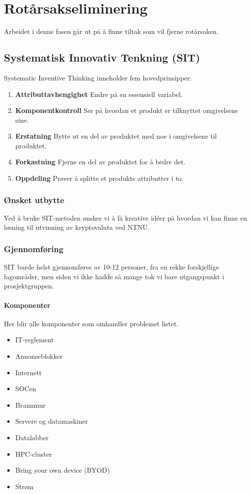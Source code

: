 \chapter{Rotårsakseliminering}
Arbeidet i denne fasen går ut på å finne tiltak som vil fjerne rotårsaken.

\section{Systematisk Innovativ Tenkning (SIT)}
Systematic Inventive Thinking inneholder fem hovedprinsipper:

\begin{enumerate}
    \item \textbf{Attributtavhengighet} Endre på en essensiell variabel.
    \item \textbf{Komponentkontroll} Ser på hvordan et produkt er tilknyttet omgivelsene sine.
    \item \textbf{Erstatning} Bytte ut en del av produktet med noe i omgivelsene til produktet.
    \item \textbf{Forkastning} Fjerne en del av produktet for å bedre det.
    \item \textbf{Oppdeling} Prøver å splitte et produkts attributter i to.
\end{enumerate}

\subsection{Ønsket utbytte}
Ved å bruke SIT-metoden ønsker vi å få kreative idéer på hvordan vi kan finne en løsning til utvinning av kryptovaluta ved NTNU. 

\subsection{Gjennomføring}
SIT burde helst gjennomføres av 10-12 personer, fra en rekke forskjellige fagområder, men siden vi ikke hadde så mange tok vi bare utgangspunkt i prosjektgruppen. 
\subsubsection{Komponenter} 
Her blir alle komponenter som omhandler problemet listet.
\begin{itemize}
    \item IT-reglement
    \item Annonseblokker
    \item Internett
    \item SOCen
    \item Brannmur
    \item Servere og datamaskiner
    \item Datalabber
    \item HPC-cluster
    \item Bring your own device (BYOD)
    \item Strøm
\end{itemize}

